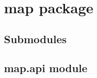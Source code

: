 \documentclass[letterpaper,10pt,english]{sphinxmanual}
\begin{document}
\section{map package}
\label{api/map::doc}\label{api/map:map-package}

\subsection{Submodules}
\label{api/map:submodules}

\subsection{map.api module}
\label{api/map:map-api-module}\label{api/map:module-map.api}
\end{document}
